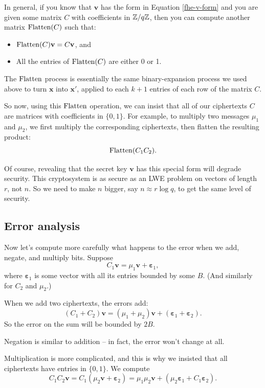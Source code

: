 In general, if you know that $\mathbf{v}$ has the form in
Equation \eqref{fhe-v-form} and you are given some matrix
$C$ with coefficients in $\mathbb{Z}/q\mathbb{Z}$, then you can
compute another matrix $\operatorname{Flatten}(C)$ such that:

\begin{itemize}
\item
  $\operatorname{Flatten}(C)\mathbf{v} = C\mathbf{v}$, and
\item
  All the entries of $\operatorname{Flatten}(C)$ are either 0 or 1.
\end{itemize}

The $\operatorname{Flatten}$ process is essentially the same binary-expansion
process we used above to turn $\mathbf{x}$ into $\mathbf{x}'$,
applied to each $k + 1$ entries of each row of the matrix $C$.

So now, using this $\operatorname{Flatten}$ operation, we can insist that all
of our ciphertexts $C$ are matrices with coefficients in
$\{ 0,1 \}$. For example, to multiply two messages
$\mu_{1}$ and $\mu_{2}$, we first multiply the corresponding
ciphertexts, then flatten the resulting product:
\[\operatorname{Flatten}( C_{1}C_{2} ).\]

Of course, revealing that the secret key $\mathbf{v}$ has this special
form will degrade security. This cryptosystem is as secure as an LWE
problem on vectors of length $r$, not $n$. So we need to make $n$
bigger, say $n \approx r\log q$, to get the same level of security.

\subsection{Error analysis}\label{error-analysis}

Now let's compute more carefully what happens to the error when we add,
negate, and multiply bits. Suppose
\[C_{1}\mathbf{v} = \mu_{1}\mathbf{v} + \mathbf{\varepsilon}_{1},\]
where $\mathbf{\varepsilon}_{1}$ is some vector with all its entries
bounded by some $B$. (And similarly for $C_{2}$ and $\mu_{2}$.)

When we add two ciphertexts, the errors add:
\[( C_{1} + C_{2} )\mathbf{v} = ( \mu_{1} + \mu_{2} )\mathbf{v} + ( \mathbf{\varepsilon}_{1} + \mathbf{\varepsilon}_{2} ).\]
So the error on the sum will be bounded by $2B$.

Negation is similar to addition -- in fact, the error won't change at
all.

Multiplication is more complicated, and this is why we insisted that all
ciphertexts have entries in $\{ 0,1 \}$. We compute
\[C_{1}C_{2}\mathbf{v} = C_{1}( \mu_{2}\mathbf{v} + \mathbf{\varepsilon}_{2} ) = \mu_{1}\mu_{2}\mathbf{v} + ( \mu_{2}\mathbf{\varepsilon}_{1} + C_{1}\mathbf{\varepsilon}_{2} ).\]

